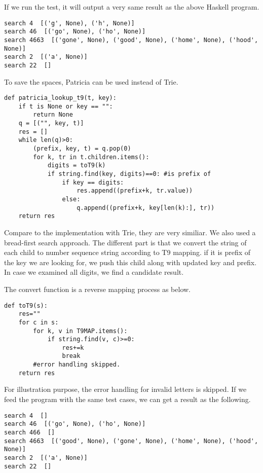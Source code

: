 \documentclass{article}
\begin{document}
If we run the test, it will output a very same result as the above Haskell
program.

\begin{verbatim}
search 4  [('g', None), ('h', None)]
search 46  [('go', None), ('ho', None)]
search 4663  [('gone', None), ('good', None), ('home', None), ('hood', None)]
search 2  [('a', None)]
search 22  []
\end{verbatim}

To save the spaces, Patricia can be used instead of Trie.

\begin{lstlisting}
def patricia_lookup_t9(t, key):
    if t is None or key == "":
        return None
    q = [("", key, t)]
    res = []
    while len(q)>0:
        (prefix, key, t) = q.pop(0)
        for k, tr in t.children.items():
            digits = toT9(k)
            if string.find(key, digits)==0: #is prefix of
                if key == digits:
                    res.append((prefix+k, tr.value))
                else:
                    q.append((prefix+k, key[len(k):], tr))
    return res
\end{lstlisting}

Compare to the implementation with Trie, they are very similiar. We also 
used a bread-first search approach. The different part is that we convert
the string of each child to number sequence string according to T9 mapping.
if it is prefix of the key we are looking for, we push this child along with
updated key and prefix. In case we examined all digits, we find a candidate
result.

The convert function is a reverse mapping process as below.
\begin{lstlisting}
def toT9(s):
    res=""
    for c in s:
        for k, v in T9MAP.items():
            if string.find(v, c)>=0:
                res+=k
                break
        #error handling skipped.
    return res
\end{lstlisting}

For illustration purpose, the error handling for invalid letters is skipped.
If we feed the program with the same test cases, we can get a result as the 
following.

\begin{verbatim}
search 4  []
search 46  [('go', None), ('ho', None)]
search 466  []
search 4663  [('good', None), ('gone', None), ('home', None), ('hood', None)]
search 2  [('a', None)]
search 22  []
\end{verbatim}
\end{document}
